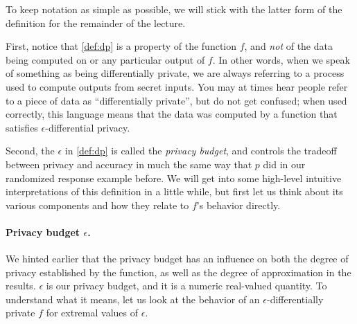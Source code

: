 \documentclass[11pt]{article}
\begin{document}
To keep notation as simple as possible, we will stick with the latter
form of the definition for the remainder of the lecture.

First, notice that \autoref{def:dp} is a property of the function
$f$, and \emph{not} of the data being computed on or any particular
output of $f$. In other words, when we speak of something as being
differentially private, we are always referring to a process used to
compute outputs from secret inputs. You may at times hear people refer
to a piece of data as ``differentially private'', but do not get
confused; when used correctly, this language means that the data was
computed by a function that satisfies $\epsilon$-differential privacy.

Second, the $\epsilon$ in \autoref{def:dp} is called the
\emph{privacy budget}, and controls the tradeoff between privacy and
accuracy in much the same way that $p$ did in our randomized response
example before. We will get into some high-level intuitive interpretations
of this definition in a little while, but first let us think about its
various components and how they relate to $f$'s behavior directly.

\paragraph{Privacy budget $\epsilon$.}
We hinted earlier that the privacy budget has an influence on both the
degree of privacy established by the function, as well as the degree of
approximation in the results. $\epsilon$ is our privacy budget, and it
is a numeric real-valued quantity. To understand what it means, let us
look at the behavior of an $\epsilon$-differentially private $f$ for
extremal values of $\epsilon$.
\end{document}

